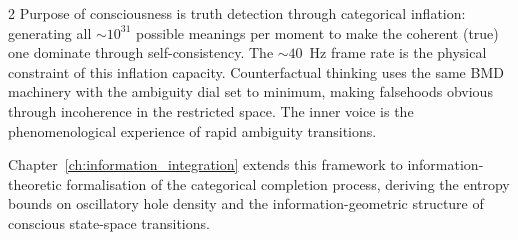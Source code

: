 \begin{multicols}{2}
Purpose of consciousness is truth detection through categorical inflation:
generating all $\sim10^{31}$ possible meanings per moment to make the
coherent (true) one dominate through self-consistency.  The $\sim40$~Hz
frame rate is the physical constraint of this inflation capacity.
Counterfactual thinking uses the same BMD machinery with the ambiguity dial
set to minimum, making falsehoods obvious through incoherence in the
restricted space.  The inner voice is the phenomenological experience of
rapid ambiguity transitions.

Chapter~\ref{ch:information_integration} extends this framework to
information-theoretic formalisation of the categorical completion process,
deriving the entropy bounds on oscillatory hole density and the
information-geometric structure of conscious state-space transitions.

\end{multicols}
